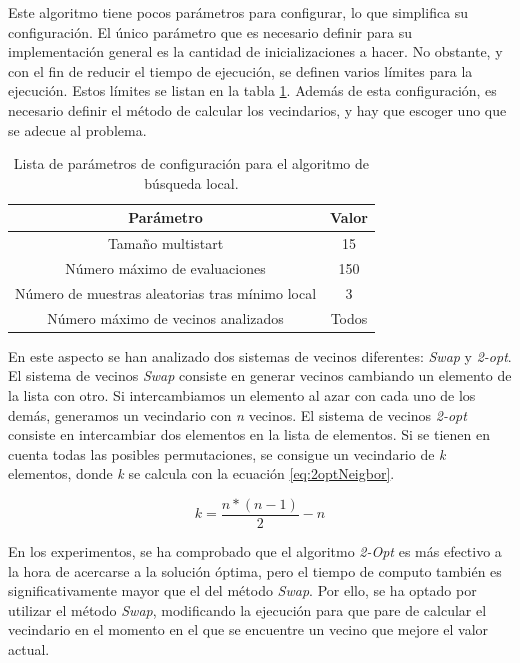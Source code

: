 \documentclass[10pt,a4paper]{article}
\begin{document}
Este algoritmo tiene pocos parámetros para configurar, lo que simplifica su configuración. El único parámetro que es necesario definir para su implementación general es la cantidad de inicializaciones a hacer. No obstante, y con el fin de reducir el tiempo de ejecución, se definen varios límites para la ejecución. Estos límites se listan en la tabla \ref{tab:lsParameters}. Además de esta configuración, es necesario definir el método de calcular los vecindarios, y hay que escoger uno que se adecue al problema. 

\begin{table}
\begin{center}
\begin{tabular}{|c||c|}
\hline
Parámetro & Valor \\
\hline \hline
Tamaño multistart & 15 \\
\hline
Número máximo de evaluaciones & 150 \\
\hline
Número de muestras aleatorias tras mínimo local & 3\\
\hline
Número máximo de vecinos analizados & Todos\\
\hline
\end{tabular}
\end{center}
\caption{Lista de parámetros de configuración para el algoritmo de búsqueda local.}
\label{tab:lsParameters}
\end{table}

En este aspecto se han analizado dos sistemas de vecinos diferentes: \textit{Swap} y \textit{2-opt}.
El sistema de vecinos \textit{Swap} consiste en generar vecinos cambiando un elemento de la lista con otro. Si intercambiamos un elemento al azar con cada uno de los demás, generamos un vecindario con \textit{n} vecinos.
El sistema de vecinos \textit{2-opt} consiste en intercambiar dos elementos en la lista de elementos. Si se tienen en cuenta todas las posibles permutaciones, se consigue un vecindario de \textit{k} elementos, donde \textit{k} se calcula con la ecuación \ref{eq:2optNeigbor}.

\begin{equation}
\label{eq:2optNeigbor}
k = \frac{n*(n-1)}{2}-n
\end{equation}

En los experimentos, se ha comprobado que el algoritmo \textit{2-Opt} es más efectivo a la hora de acercarse a la solución óptima, pero el tiempo de computo también es significativamente mayor que el del método \textit{Swap}. Por ello, se ha optado por utilizar el método \textit{Swap}, modificando la ejecución para que pare de calcular el vecindario en el momento en el que se encuentre un vecino que mejore el valor actual. 
\end{document}
